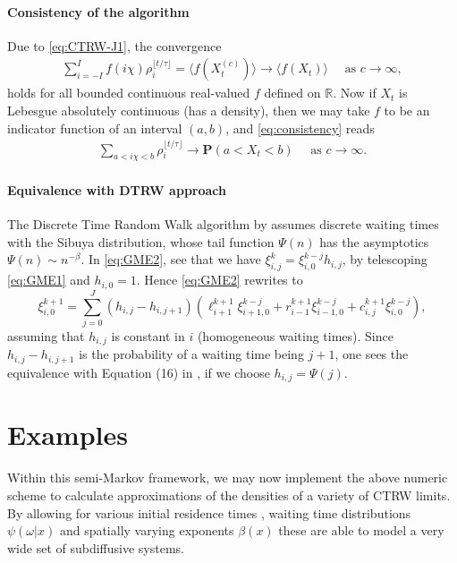 \documentclass[a4paper,12pt]{elsarticle}
\numberwithin{equation}{section}
\theoremstyle{plain}
\theoremstyle{definition}
\theoremstyle{remark}
\numberwithin{equation}{section}
\newcommand{\R}{\mathbb R}
\newcommand{\1}{\mathbf 1}
\newcommand{\pr}{\mathbf P}
\begin{document}
\paragraph{Consistency of the algorithm}
Due to \eqref{eq:CTRW-J1}, the convergence
\begin{align} \label{eq:consistency}
  \sum_{i=-I}^I f(i\chi) \rho^{\lfloor t/\tau \rfloor}_i
  = \langle f(X^{(c)}_t) \rangle
  \longrightarrow \langle f(X_t) \rangle
  \quad \text{ as } c \to \infty,
\end{align}
holds for all bounded continuous real-valued $f$ defined on $\R$.
Now if $X_t$ is Lebesgue absolutely continuous (has a density), then we may take $f$ to be an indicator function of an interval $(a,b)$, and \eqref{eq:consistency} reads
\begin{align}
  \sum_{a < i\chi < b} \rho_i^{\lfloor t / \tau \rfloor}
  \longrightarrow
  \pr(a < X_t < b) \quad \text{ as } c \to \infty.
\end{align}


\paragraph{Equivalence with DTRW approach}  The Discrete Time Random Walk algorithm by
\cite{Angstmann2015a} assumes discrete waiting times with the Sibuya
distribution, whose tail function $\Psi(n)$ has the asymptotics
$\Psi(n) \sim n^{-\beta}$.
In \eqref{eq:GME2}, see that we have $\xi^k_{i,j} = \xi^{k-j}_{i,0} h_{i,j}$,
by telescoping \eqref{eq:GME1} and $h_{i,0} = 1$.  Hence
\eqref{eq:GME2} rewrites to
$$\xi^{k+1}_{i,0} = \sum_{j=0}^J (h_{i,j} - h_{i,j+1})
(\ell^{k+1}_{i+1} \xi^{k-j}_{i+1, 0} + r^{k+1}_{i-1} \xi^{k-j}_{i-1,0} + c^{k+1}_{i,j} \xi^{k-j}_{i,0}),$$
assuming that $h_{i,j}$ is constant in $i$ (homogeneous waiting times).
Since $h_{i,j} - h_{i,j+1}$ is the probability of a waiting time being
$j+1$, one sees the equivalence with Equation (16) in \cite{Angstmann2015a},
if we choose $h_{i,j} = \Psi(j)$.

\section{Examples}
\label{sec:examples}

Within this semi-Markov framework, we may now implement the above numeric scheme to calculate approximations of the densities of a variety of CTRW limits. By allowing for various initial residence times \cite{Gill2016}, waiting time distributions $\psi (\omega | x)$ and spatially varying exponents $\beta (x)$ these are able to model a very wide set of subdiffusive systems. \\
\end{document}
